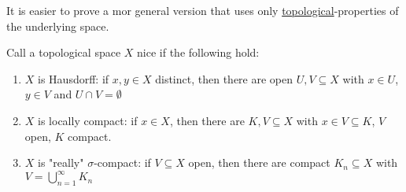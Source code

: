 \begin{remark}
	It is easier to prove a mor general version that uses only \underline{topological}-properties of the underlying space.
\end{remark}

\begin{definition}
	Call a topological space $X$ nice if the following hold:
	\begin{enumerate}
		\item $X$ is Hausdorff: if $x,y \in X$ distinct, then there are open $U,V \subseteq X$ with  $x \in U$, $y \in V$ and $U \cap V  = \emptyset$
		\item $X$ is locally compact:
			if $x \in X$, then there are $K, V \subseteq X$ with $x \in V \subseteq K $,
			$V$ open, $K$ compact.
		\item $X$ is "really" $\sigma$-compact: if $V \subseteq X$ open, then there are compact $K_n \subseteq X$ with $V = \bigcup_{n=1}^{\infty} K_n$
	\end{enumerate}
\end{definition}

